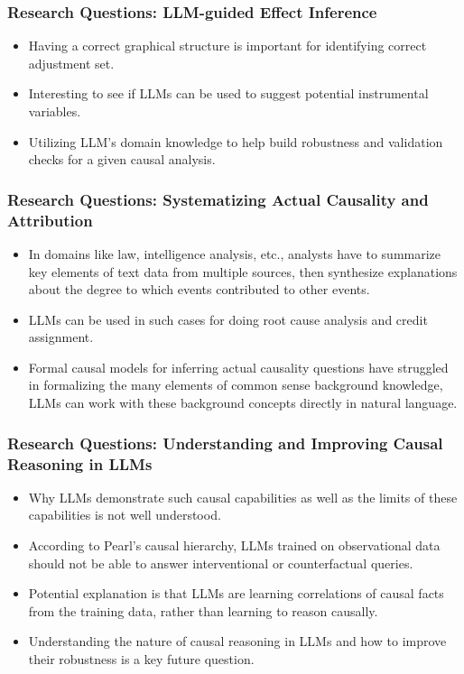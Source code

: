 \documentclass{beamer}
\begin{document}
\begin{frame}
	\frametitle{Research Questions: LLM-guided Effect Inference}
	\begin{itemize}
		\item Having a correct graphical structure is important for identifying
			correct adjustment set.
		\item Interesting to see if LLMs can be used to suggest
			potential instrumental variables.
		\item Utilizing LLM's domain knowledge to help build robustness
			and validation checks for a given causal analysis.
	\end{itemize}
\end{frame}

\begin{frame}
	\frametitle{Research Questions: Systematizing Actual Causality and Attribution}
	\begin{itemize}
		\item In domains like law, intelligence analysis, etc., analysts 
			have to summarize key elements of text data from 
			multiple sources, then synthesize explanations about the 
			degree to which events contributed to other events.
		\item LLMs can be used in such cases for doing root cause analysis and
			credit assignment.
		\item Formal causal models for inferring actual causality
			questions have struggled in formalizing the many
			elements of common sense background knowledge, LLMs can
			work with these background concepts directly in natural
			language.
	\end{itemize}
\end{frame}

\begin{frame}
	\frametitle{Research Questions: Understanding and Improving Causal Reasoning in LLMs}
	\begin{itemize}
		\item Why LLMs demonstrate such causal capabilities as well as
			the limits of these capabilities is not well
			understood.
		\item According to Pearl's causal hierarchy, LLMs trained on
			observational data should not be able to answer
			interventional or counterfactual queries.
		\item Potential explanation is that LLMs are learning correlations
			of causal facts from the training data, rather than learning
			to reason causally.
		\item Understanding the nature of causal reasoning in LLMs and how to
			improve their robustness is a key future question.
	\end{itemize}
\end{frame}
\end{document}

